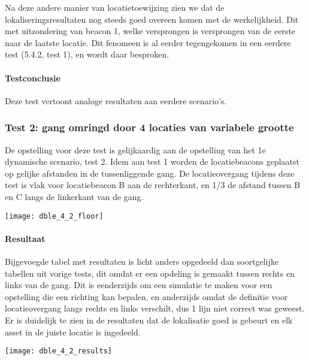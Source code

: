 Na deze andere manier van locatietoewijzing zien we dat de lokaliseringsresultaten nog steeds goed overeen komen met de werkelijkheid. Dit met uitzondering van beacon 1, welke versprongen is versprongen van de eerste naar de laatste locatie. Dit fenomeen is al eerder tegengekomen in een eerdere test (5.4.2, test 1), en wordt daar besproken.

\paragraph{Testconclusie}
Deze test vertoont analoge resultaten aan eerdere scenario's.

\subsubsection{Test 2: gang omringd door 4 locaties van variabele grootte}
\begin{minipage}{0.55\textwidth}
De opstelling voor deze test is gelijkaardig aan de opstelling van het 1e dynamische scenario, test 2. Idem aan test 1 worden de locatiebeacons geplaatst op gelijke afstanden in de tussenliggende gang. De locatieovergang tijdens deze test is vlak voor locatiebeacon B aan de rechterkant, en 1/3 de afstand tussen B en C langs de linkerkant van de gang.
\end{minipage}
\hfill
\begin{minipage}{0.42\textwidth}
	\texttt{[image: dble\_4\_2\_floor]}
\end{minipage}

\paragraph{Resultaat}
\begin{minipage}{0.42\textwidth}
Bijgevoegde tabel met resultaten is licht anders opgedeeld dan soortgelijke tabellen uit vorige tests, dit omdat er een opdeling is gemaakt tussen rechts en links van de gang. Dit is eenderzijds om een simulatie te maken voor een opstelling die een richting kan bepalen, en anderzijds omdat de definitie voor locatieovergang langs rechts en links verschilt, dus 1 lijn niet correct was geweest.
Er is duidelijk te zien in de resultaten dat de lokalisatie goed is gebeurt en elk asset in de juiste locatie is ingedeeld.
\end{minipage}
\hfill
\begin{minipage}{0.55\textwidth}
	\texttt{[image: dble\_4\_2\_results]}
\end{minipage}

